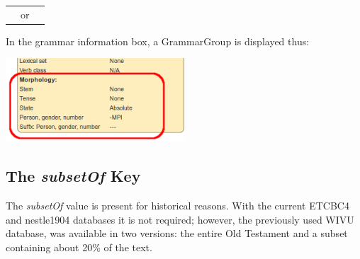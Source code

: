 \documentclass[11pt,oneside,a4paper]{memoir}
\begin{document}
\begin{center}
\begin{tabular}{rcl}
  \vspace{0pt}\parbox{0.3\textwidth}{\includegraphics[width=0.3\textwidth]{morph1a.png}} %
 & or &
  \vspace{0pt}\parbox{0.3\textwidth}{\includegraphics[width=0.3\textwidth]{morph1b.png}}
\end{tabular}
\end{center}

\Needspace*{5cm}%
In the grammar information box, a GrammarGroup is displayed thus:

\begin{center}
  \includegraphics[width=0.5\textwidth]{morph2.png}
\end{center}

\subsection{The \emph{subsetOf} Key}\label{subsetof}

The \emph{subsetOf} value is present for historical reasons. With the current ETCBC4 and nestle1904
databases it is not required; however, the previously used WIVU database, was available in two
versions: the entire Old Testament and a subset containing about 20\% of the text.
\end{document}
